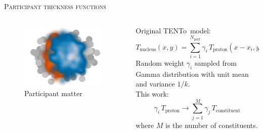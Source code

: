 \documentclass[aspectratio=169]{beamer}
\newcommand{\trento}{T\raisebox{-0.3ex}{R}ENTo}
\begin{document}
\begin{frame}[t]{\scshape Participant thickness functions}
  \begin{columns}[T]
    \begin{column}{.5\textwidth}
      \begin{figure}
        \includegraphics[width=\textwidth]{trento_thickness}\\
        \small Participant matter
      \end{figure}
    \end{column}
    \begin{column}{.5\textwidth}
      \centering \bigskip
      \textcolor{theme}{Original \trento\ model:}
      \begin{equation*}
        T_\text{nucleus}(x, y) = \sum\limits_{i=1}^{N_\text{part}}
        \gamma_i\, T_\text{proton}(x - x_i, y - y_i)
      \end{equation*}
      {\small Random weight $\gamma_i$ sampled from Gamma distribution with unit mean
      and variance $1/k$.}\\[2ex]
      \textcolor{theme}{This work:}
      \begin{equation*}
        \gamma_i\, T_\text{proton} \rightarrow \sum\limits_{j=1}^{M}
        \gamma_j\,T_\text{constituent}
      \end{equation*}
      \small where $M$ is the number of constituents.
    \end{column}
  \end{columns}
\end{frame}
\end{document}
